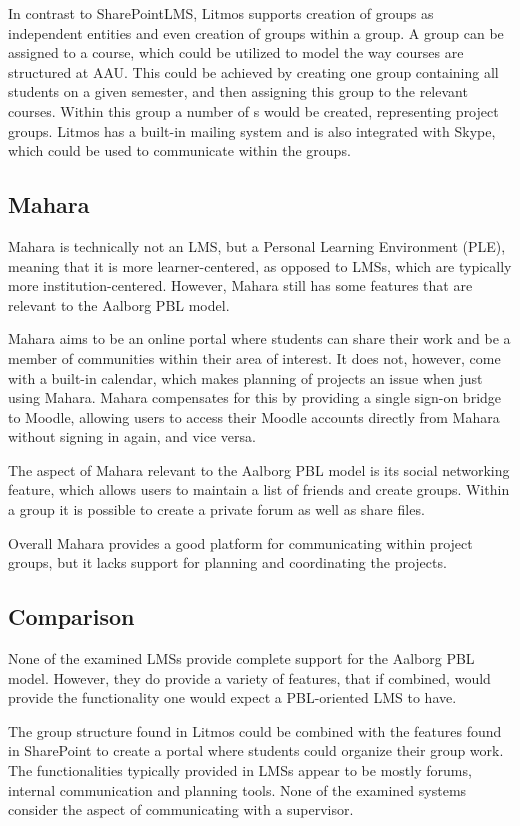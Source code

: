 In contrast to SharePointLMS, Litmos supports creation of groups as independent entities and even creation of groups within a group.
A group can be assigned to a course, which could be utilized to model the way courses are structured at AAU.
This could be achieved by creating one group containing all students on a given semester, and then assigning this group to the relevant courses.
Within this group a number of \subgroup{}s would be created, representing project groups.
Litmos has a built-in mailing system and is also integrated with Skype, which could be used to communicate within the groups.


\subsection{Mahara}
Mahara \citep{mahara} is technically not an LMS, but a Personal Learning Environment (PLE), meaning that it is more learner-centered, as opposed to LMSs, which are typically more institution-centered.
However, Mahara still has some features that are relevant to the Aalborg PBL model.

Mahara aims to be an online portal where students can share their work and be a member of communities within their area of interest.
It does not, however, come with a built-in calendar, which makes planning of projects an issue when just using Mahara.
Mahara compensates for this by providing a single sign-on bridge to Moodle, allowing users to access their Moodle accounts directly from Mahara without signing in again, and vice versa.

The aspect of Mahara relevant to the Aalborg PBL model is its social networking feature, which allows users to maintain a list of friends and create groups.
Within a group it is possible to create a private forum as well as share files.

Overall Mahara provides a good platform for communicating within project groups, but it lacks support for planning and coordinating the projects.

\subsection{Comparison}
None of the examined LMSs provide complete support for the Aalborg PBL model.
However, they do provide a variety of features, that if combined, would provide the functionality one would expect a PBL-oriented LMS to have.

The group structure found in Litmos could be combined with the features found in SharePoint to create a portal where students could organize their group work.
The functionalities typically provided in LMSs appear to be mostly forums, internal communication and planning tools.
None of the examined systems consider the aspect of communicating with a supervisor.


